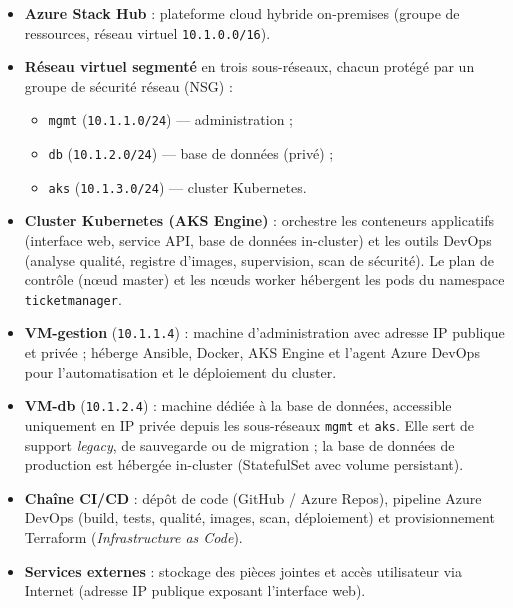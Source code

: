 \begin{itemize}
    \item \textbf{Azure Stack Hub} : plateforme cloud hybride on-premises
    (groupe de ressources, réseau virtuel \texttt{10.1.0.0/16}).

    \item \textbf{Réseau virtuel segmenté} en trois sous-réseaux, chacun
    protégé par un groupe de sécurité réseau (NSG) :
    \begin{itemize}
        \item \texttt{mgmt} (\texttt{10.1.1.0/24}) — administration ;
        \item \texttt{db} (\texttt{10.1.2.0/24}) — base de données (privé) ;
        \item \texttt{aks} (\texttt{10.1.3.0/24}) — cluster Kubernetes.
    \end{itemize}

    \item \textbf{Cluster Kubernetes (AKS Engine)} : orchestre les conteneurs
    applicatifs (interface web, service API, base de données in-cluster) et les
    outils DevOps (analyse qualité, registre d'images, supervision, scan de
    sécurité). Le plan de contrôle (nœud master) et les nœuds worker hébergent
    les pods du namespace \texttt{ticketmanager}.

    \item \textbf{VM-gestion} (\texttt{10.1.1.4}) : machine d'administration
    avec adresse IP publique et privée ; héberge Ansible, Docker, AKS Engine
    et l'agent Azure DevOps pour l'automatisation et le déploiement du cluster.

    \item \textbf{VM-db} (\texttt{10.1.2.4}) : machine dédiée à la base de
    données, accessible uniquement en IP privée depuis les sous-réseaux
    \texttt{mgmt} et \texttt{aks}. Elle sert de support \textit{legacy},
    de sauvegarde ou de migration ; la base de données de production est
    hébergée in-cluster (StatefulSet avec volume persistant).

    \item \textbf{Chaîne CI/CD} : dépôt de code (GitHub / Azure Repos),
    pipeline Azure DevOps (build, tests, qualité, images, scan, déploiement)
    et provisionnement Terraform (\textit{Infrastructure as Code}).

    \item \textbf{Services externes} : stockage des pièces jointes et accès
    utilisateur via Internet (adresse IP publique exposant l'interface web).
\end{itemize}
